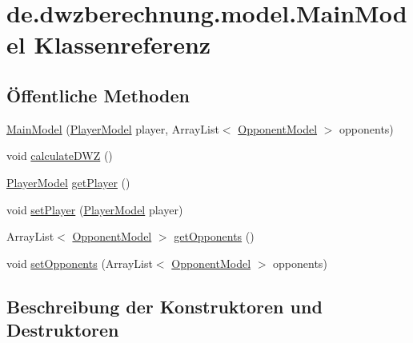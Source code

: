 \hypertarget{classde_1_1dwzberechnung_1_1model_1_1_main_model}{}\section{de.\+dwzberechnung.\+model.\+Main\+Model Klassenreferenz}
\label{classde_1_1dwzberechnung_1_1model_1_1_main_model}
\subsection*{Öffentliche Methoden}
\begin{DoxyCompactItemize}
\item 
\hyperlink{classde_1_1dwzberechnung_1_1model_1_1_main_model_a9dae6c87f6f05b98d3b35511b4096cfc}{Main\+Model} (\hyperlink{classde_1_1dwzberechnung_1_1model_1_1_player_model}{Player\+Model} player, Array\+List$<$ \hyperlink{classde_1_1dwzberechnung_1_1model_1_1_opponent_model}{Opponent\+Model} $>$ opponents)
\item 
void \hyperlink{classde_1_1dwzberechnung_1_1model_1_1_main_model_ac92288b280a33435b9321d368a8bafb5}{calculate\+D\+WZ} ()
\item 
\hyperlink{classde_1_1dwzberechnung_1_1model_1_1_player_model}{Player\+Model} \hyperlink{classde_1_1dwzberechnung_1_1model_1_1_main_model_af235ea2d825a8998dd8f475d69774661}{get\+Player} ()
\item 
void \hyperlink{classde_1_1dwzberechnung_1_1model_1_1_main_model_a8daa56ac43496a049c051df165bedb6f}{set\+Player} (\hyperlink{classde_1_1dwzberechnung_1_1model_1_1_player_model}{Player\+Model} player)
\item 
Array\+List$<$ \hyperlink{classde_1_1dwzberechnung_1_1model_1_1_opponent_model}{Opponent\+Model} $>$ \hyperlink{classde_1_1dwzberechnung_1_1model_1_1_main_model_a1e4b9ac2d820ae7dd6a6ee17790360ac}{get\+Opponents} ()
\item 
void \hyperlink{classde_1_1dwzberechnung_1_1model_1_1_main_model_a73cc014fa0a0d6765159723a969cff0f}{set\+Opponents} (Array\+List$<$ \hyperlink{classde_1_1dwzberechnung_1_1model_1_1_opponent_model}{Opponent\+Model} $>$ opponents)
\end{DoxyCompactItemize}


\subsection{Beschreibung der Konstruktoren und Destruktoren}
